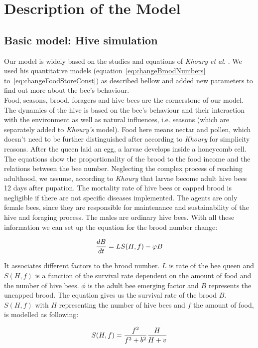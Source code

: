 \section{Description of the Model}
\subsection{Basic model: Hive simulation}
	Our model is widely based on the studies and equations of \textit{Khoury et al.} \cite{khoury13}. We used his quantitative models (equation~\ref{eq:changeBroodNumbers} to~\ref{eq:changeFoodStoreConst}) as described bellow and added new parameters to find out more about the bee's behaviour.\\
	Food, seasons, brood, foragers and hive bees are the cornerstone of our model. The dynamics of the hive is based on the bee's behaviour and their interaction with the environment as well as natural influences, i.e. seasons (which are separately added to \textit{Khoury's} model). Food here means nectar and pollen, which doesn't need to be further distinguished after according to \textit{Khoury} for simplicity reasons. After the queen laid an egg, a larvae develops inside a honeycomb cell. The equations show the proportionality of the brood to the food income and the relations between the bee number. Neglecting the complex process of reaching adulthood, we assume, according to \textit{Khoury} that larvae become adult hive bees 12 days after pupation. The mortality rate of hive bees or capped brood is negligible if there are not specific diseases implemented. The agents are only female bees, since they are responsible for maintenance and sustainability of the hive and foraging process. The males are ordinary hive bees. With all these information we can set up the equation for the brood number change:
	
	\begin{equation}\label{eq:changeBroodNumbers}
		{dB \over dt} = LS(H,f)-\phi B
	\end{equation}
	
	It associates different factors to the brood number. $L$ is rate of the bee queen and $S(H,f)$ is a function of the survival rate dependent on the amount of food and the number of hive bees. $\phi$ is the adult bee emerging factor and $B$ represents the uncapped brood. The equation gives us the survival rate of the brood $B$. $S(H,f)$ with $H$ representing the number of hive bees and $f$ the amount of food, is modelled as following:
	
	\begin{equation}\label{eq:functionHiveBeesFood}
		S(H,f)={f^2 \over f^2+b^2}{H \over H+v}
	\end{equation}
	

